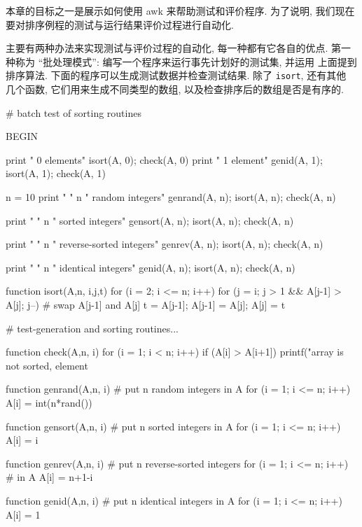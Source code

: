 本章的目标之一是展示如何使用 awk 来帮助测试和评价程序. 为了说明, 我们现在
要对排序例程的测试与运行结果评价过程进行自动化.

主要有两种办法来实现测试与评价过程的自动化, 每一种都有它各自的优点. 第一 
种称为 ``批处理模式'': 编写一个程序来运行事先计划好的测试集, 并运用
上面提到排序算法.
下面的程序可以生成测试数据并检查测试结果. 除了 \texttt{isort}, 还有其他
几个函数, 它们用来生成不同类型的数组, 以及检查排序后的数组是否是有序的.
\begin{awkcode}
    # batch test of sorting routines

    BEGIN {
        print "    0 elements"
        isort(A, 0); check(A, 0)    
        print "    1 element"
        genid(A, 1); isort(A, 1); check(A, 1)
        
        n = 10
        print "    " n " random integers"
        genrand(A, n); isort(A, n); check(A, n)
        
        print "    " n " sorted integers"
        gensort(A, n); isort(A, n); check(A, n)
        
        print "    " n " reverse-sorted integers"
        genrev(A, n); isort(A, n); check(A, n)
        
        print "    " n " identical integers"
        genid(A, n); isort(A, n); check(A, n)
    }

    function isort(A,n,     i,j,t) {
        for (i = 2; i <= n; i++)
            for (j = i; j > 1 && A[j-1] > A[j]; j--) {
                # swap A[j-1] and A[j]
                t = A[j-1]; A[j-1] = A[j]; A[j] = t
            }
    }

\end{awkcode}
\begin{awkcode}
    # test-generation and sorting routines...

    function check(A,n,   i) {
        for (i = 1; i < n; i++)
            if (A[i] > A[i+1])
                printf("array is not sorted, element %
    }

    function genrand(A,n,  i) { # put n random integers in A
        for (i = 1; i <= n; i++)
            A[i] = int(n*rand())
    }

    function gensort(A,n,  i) { # put n sorted integers in A
        for (i = 1; i <= n; i++)
            A[i] = i
    }

    function genrev(A,n,  i) {  # put n reverse-sorted integers
        for (i = 1; i <= n; i++)  # in A
            A[i] = n+1-i
    }

    function genid(A,n,  i) {   # put n identical integers in A
        for (i = 1; i <= n; i++)
            A[i] = 1
    }
\end{awkcode}


